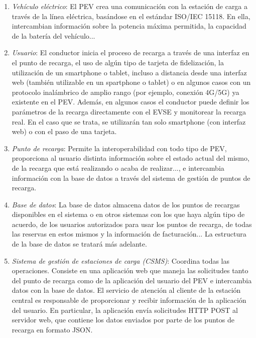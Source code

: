 \documentclass[12pt,a4paper,onecolumn,oneside]{report}
\begin{document}
\begin{enumerate}

\item \textit{Vehículo eléctrico}: El PEV crea una comunicación con la estación de carga a través de la línea eléctrica, basándose en el estándar ISO/IEC 15118. En ella, intercambian información sobre la potencia máxima permitida, la capacidad de la batería del vehículo...

\item \textit{Usuario}: El conductor inicia el proceso de recarga a través de una interfaz en el punto de recarga, el uso de algún tipo de tarjeta de fidelización, la utilización de un smartphone o tablet, incluso a distancia desde una interfaz web (también utilizable en un spartphone o tablet) o en algunos casos con un protocolo inalámbrico de amplio rango (por ejemplo, conexión 4G/5G) ya existente en el PEV. Además, en algunos casos el conductor puede definir los parámetros de la recarga directamente con el EVSE y monitorear la recarga real. En el caso que se trata, se utilizarán tan solo smartphone (con interfaz web) o con el paso de una tarjeta.

\item \textit{Punto de recarga}: Permite la interoperabilidad con todo tipo de PEV, proporciona al usuario distinta información sobre el estado actual del mismo, de la recarga que está realizando o acaba de realizar..., e intercambia información con la base de datos a través del sistema de gestión de puntos de recarga.

\item \textit{Base de datos}: La base de datos almacena datos de los puntos de recargas disponibles en el sistema o en otros sistemas con los que haya algún tipo de acuerdo, de los usuarios autorizados para usar los puntos de recarga, de todas las reservas en estos mismos y la información de facturación... La estructura de la base de datos se tratará más adelante.

\item \textit{Sistema de gestión de estaciones de carga (CSMS)}: Coordina todas las operaciones. Consiste en una aplicación web que maneja las solicitudes tanto del punto de recarga como de la aplicación del usuario del PEV e intercambia datos con la base de datos.  El servicio de atención al cliente de la estación central es responsable de proporcionar y recibir información de la aplicación del usuario. En particular, la aplicación envía solicitudes HTTP POST al servidor web, que contiene los datos enviados por parte de los puntos de recarga en formato JSON.

\end{enumerate}
\end{document}
